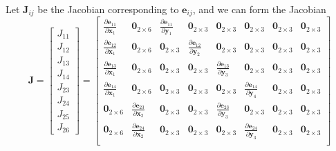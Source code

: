 \documentclass{article}
\begin{document}
  Let $\mathbf{J}_{ij}$ be the Jacobian corresponding to $\mathbf{e}_{ij}$, and we can form the Jacobian 
  \begin{equation}
    \mathbf{J} = \begin{bmatrix} J_{11} \\ J_{12} \\ J_{13} \\ J_{14} \\ J_{23} \\ J_{24} \\ J_{25} \\ J_{26} \end{bmatrix} = \begin{bmatrix}
      \frac{\partial \mathbf{e}_{11}}{\partial \mathbf{x}_1} & \mathbf{0}_{2 \times 6} & \frac{\partial \mathbf{e}_{11}}{\partial \mathbf{y}_1} & \mathbf{0}_{2 \times 3} & \mathbf{0}_{2 \times 3} & \mathbf{0}_{2 \times 3} & \mathbf{0}_{2 \times 3} & \mathbf{0}_{2 \times 3} \\
      \frac{\partial \mathbf{e}_{12}}{\partial \mathbf{x}_1} & \mathbf{0}_{2 \times 6} & \mathbf{0}_{2 \times 3} & \frac{\partial \mathbf{e}_{12}}{\partial \mathbf{y}_2} & \mathbf{0}_{2 \times 3} & \mathbf{0}_{2 \times 3} & \mathbf{0}_{2 \times 3} & \mathbf{0}_{2 \times 3} \\
      \frac{\partial \mathbf{e}_{13}}{\partial \mathbf{x}_1} & \mathbf{0}_{2 \times 6} & \mathbf{0}_{2 \times 3} & \mathbf{0}_{2 \times 3} & \frac{\partial \mathbf{e}_{13}}{\partial \mathbf{y}_3} & \mathbf{0}_{2 \times 3} & \mathbf{0}_{2 \times 3} & \mathbf{0}_{2 \times 3} \\
      \frac{\partial \mathbf{e}_{14}}{\partial \mathbf{x}_1} & \mathbf{0}_{2 \times 6} & \mathbf{0}_{2 \times 3} & \mathbf{0}_{2 \times 3} & \mathbf{0}_{2 \times 3} & \frac{\partial \mathbf{e}_{14}}{\partial \mathbf{y}_4} & \mathbf{0}_{2 \times 3} & \mathbf{0}_{2 \times 3} \\

      \mathbf{0}_{2 \times 6} & \frac{\partial \mathbf{e}_{23}}{\partial \mathbf{x}_2}  & \mathbf{0}_{2 \times 3} & \mathbf{0}_{2 \times 3} & \frac{\partial \mathbf{e}_{23}}{\partial \mathbf{y}_3} & \mathbf{0}_{2 \times 3} & \mathbf{0}_{2 \times 3} & \mathbf{0}_{2 \times 3} \\

      \mathbf{0}_{2 \times 6} & \frac{\partial \mathbf{e}_{24}}{\partial \mathbf{x}_2}  & \mathbf{0}_{2 \times 3} & \mathbf{0}_{2 \times 3} & \mathbf{0}_{2 \times 3} & \frac{\partial \mathbf{e}_{24}}{\partial \mathbf{y}_3} & \mathbf{0}_{2 \times 3} & \mathbf{0}_{2 \times 3} \\


\end{bmatrix}
\end{equation}
\end{document}
